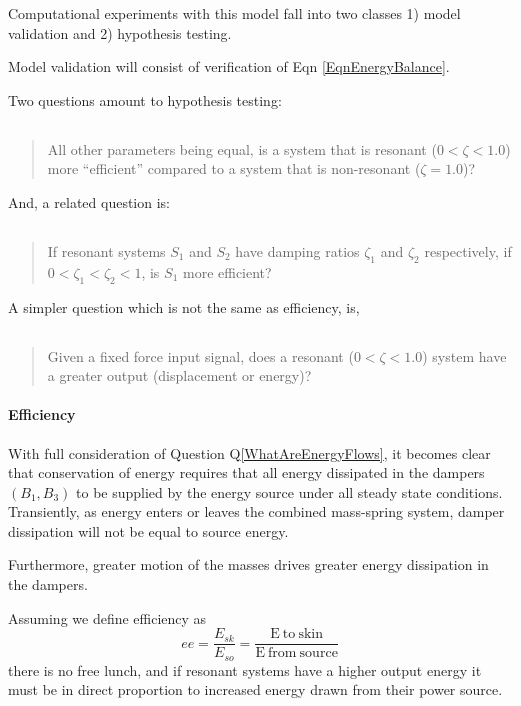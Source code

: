 \documentclass[letterpaper,11pt]{article}
\begin{document}
Computational experiments with this model fall into two classes 1) model validation and 2)
hypothesis testing.

Model validation will consist of verification of Eqn \ref{EqnEnergyBalance}.

Two questions amount to hypothesis testing:
\subsection{}\label{ResQ1}
\begin{quotation}  All other parameters being equal, is a system that is resonant ($0<\zeta<1.0$) more ``efficient''
compared to a system that is non-resonant ($\zeta=1.0$)?
\end{quotation}

And, a related question is:
\subsection{}\label{ResQ2}
\begin{quotation}
If resonant systems  $S_1$ and $S_2$ have damping ratios $\zeta_1$ and $\zeta_2$ respectively, if
$0<\zeta_1 < \zeta_2<1$, is $S_1$ more efficient?
\end{quotation}

A simpler question which is not the same as efficiency, is,
\subsection{}\label{ResQ3}
\begin{quotation} Given a fixed force input signal,
does a resonant  ($0<\zeta<1.0$)  system have a greater output (displacement or energy)?
\end{quotation}


\paragraph{Efficiency}
With full consideration of Question Q\ref{WhatAreEnergyFlows}, it becomes
clear that conservation of energy requires that all energy dissipated in the
dampers $(B_1, B_3)$ to be supplied by the energy source under all steady state conditions.
Transiently, as energy enters or leaves the combined mass-spring system, damper dissipation
will not be equal to source energy.

Furthermore,
greater motion of the masses drives greater energy dissipation in the dampers.

Assuming we define efficiency as
\[
ee = \frac {E_{sk}}  {E_{so}} = \frac {\mathrm{E~to ~skin} } { \mathrm {E~from~source} }
\]
there is
no free lunch, and if resonant systems have a higher output energy it must be
in direct proportion to increased energy drawn from their power source.
\end{document}
